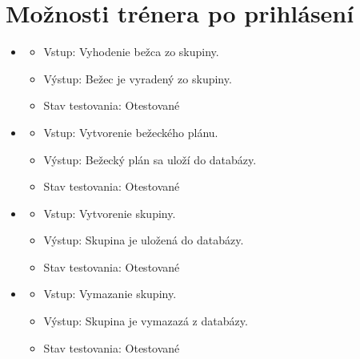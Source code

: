 \documentclass[12pt,a4paper]{report}
\theoremstyle{definition}
\theoremstyle{remark}
\begin{document}
\section{Možnosti trénera po prihlásení}
\begin{itemize}
	
	\item\begin{itemize}
	\item Vstup: Vyhodenie bežca zo skupiny.
	\item Výstup: Bežec je vyradený zo skupiny.
	\item Stav testovania: Otestované
	\end{itemize}
	
	\item\begin{itemize}
	\item Vstup: Vytvorenie bežeckého plánu.
	\item Výstup: Bežecký plán sa uloží do databázy.
	\item Stav testovania: Otestované
	\end{itemize}
	
	\item\begin{itemize}
	\item Vstup: Vytvorenie skupiny.
	\item Výstup: Skupina je uložená do databázy.
	\item Stav testovania: Otestované
	\end{itemize}
	
	\item\begin{itemize}
	\item Vstup: Vymazanie skupiny.
	\item Výstup: Skupina je vymazazá z databázy.
	\item Stav testovania: Otestované
	\end{itemize}
	
\end{itemize}
\end{document}
